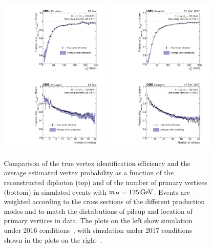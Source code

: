 \begin{figure}[h!]
  \centering
  \includegraphics[width=0.49\textwidth]{Figures/Objects/VtxProbPt2016}
  \includegraphics[width=0.49\textwidth]{Figures/Objects/VtxProbPt2017} \\
  \includegraphics[width=0.49\textwidth]{Figures/Objects/VtxProbNvtx2016}
  \includegraphics[width=0.49\textwidth]{Figures/Objects/VtxProbNvtx2017}
  \caption[Vertex probability validation in simulated \Hgg events.]
  {
    Comparison of the true vertex identification efficiency and the average estimated
    vertex probability as a function of the reconstructed diphoton \pt (top) and of the number of
    primary vertices (bottom) in simulated \Hgg events with $m_{H} = \SI{125}{GeV}$. Events are weighted
    according to the cross sections of the different production modes and to match the distributions
    of pileup and location of primary vertices in data.
    The plots on the left show simulation under 2016 conditions~\cite{HIG-16-040}, 
    with simulation under 2017 conditions shown in the plots on the right~\cite{HIG-18-029}.
  }
  \label{fig:obj_VtxProb}
\end{figure}

